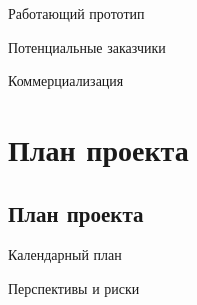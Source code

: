 \documentclass[usenames,dvipsnames,pdftex,unicode,hidelinks]{beamer}
\begin{document}
\begin{frame}{Работающий прототип}
\begin{center}
    \end{center}
  \end{frame}

  \begin{frame}{Потенциальные заказчики}

  \end{frame}

  \begin{frame}{Коммерциализация}

  \end{frame}

  \section{План проекта}
  \subsection{План проекта}
  \begin{frame}{Календарный план}

  \end{frame}

  \begin{frame}{Перспективы и риски}

  \end{frame}
\end{document}
